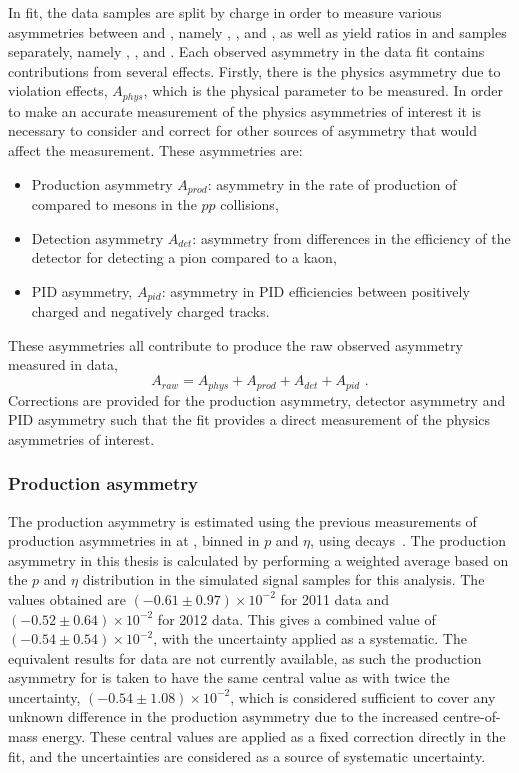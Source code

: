 In \CP fit, the data samples are split by charge in order to measure various asymmetries between \Bp and \Bm, namely \Akpi, \Akk, \Apipi and \Apipipipi, as well as yield ratios in \Bp and \Bm samples separately, namely \Rptwo, \Rmtwo, \Rpfour and \Rmfour. Each observed asymmetry in the data fit contains contributions from several effects. Firstly, there is the physics asymmetry due to \CP violation effects, $A_{phys}$, which is the physical parameter to be measured. In order to make an accurate measurement of the physics asymmetries of interest it is necessary to consider and correct for other sources of asymmetry that would affect the measurement. These asymmetries are:
\begin{itemize}
\item Production asymmetry $A_{prod}$: asymmetry in the rate of production of \Bp compared to \Bm mesons in the $pp$ collisions,
\item Detection asymmetry $A_{det}$: asymmetry from differences in the efficiency of the detector for detecting a pion compared to a kaon,
\item PID asymmetry, $A_{pid}$: asymmetry in PID efficiencies between positively charged and negatively charged tracks.
\end{itemize}
These asymmetries all contribute to produce the raw observed asymmetry measured in data,
\begin{equation}
A_{raw} = A_{phys} + A_{prod} + A_{det} + A_{pid} \text{ .}
\label{asymmetries}
\end{equation} 
Corrections are provided for the production asymmetry, detector asymmetry and PID asymmetry such that the \CP fit provides a direct measurement of the physics asymmetries of interest.

\subsubsection{Production asymmetry}

The \Bpm production asymmetry is estimated using the previous measurements of production asymmetries in \runone at \lhcb, binned in $p$ and $\eta$, using \decay{\Bp}{\Dzb\pip} decays~\cite{LHCb-PAPER-2016-054}. The production asymmetry in this thesis is calculated by performing a weighted average based on the $p$ and $\eta$ distribution in the simulated signal samples for this analysis. The values obtained are $(-0.61 \pm 0.97) \times 10^{-2}$ for 2011 data and $(-0.52 \pm 0.64) \times 10^{-2}$ for 2012 data. This gives a combined \runone value of $(-0.54 \pm 0.54) \times 10^{-2}$, with the uncertainty applied as a systematic. The equivalent results for \runtwo data are not currently available, as such the production asymmetry for \runtwo is taken to have the same central value as \runone with twice the uncertainty, $(-0.54 \pm 1.08) \times 10^{-2}$, which is considered sufficient to cover any unknown difference in the production asymmetry due to the increased centre-of-mass energy. These central values are applied as a fixed correction directly in the \CP fit, and the uncertainties are considered as a source of systematic uncertainty.

